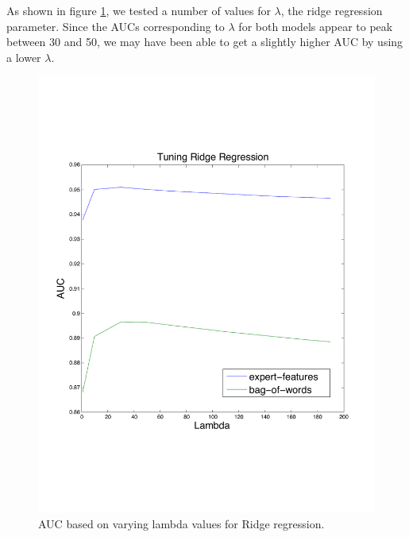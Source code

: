 \documentclass[preprint]{acm_proc_article-sp}
\begin{document}
As shown in figure \ref{fig:lambda}, we tested a number of values for $\lambda$, the ridge regression parameter. 
Since the AUCs corresponding to $\lambda$ for both models appear to peak between 30 and 50, we may have been able to 
get a slightly higher AUC by using a lower $\lambda$.

\begin{figure}[h]
    \centering
    \includegraphics[width=\linewidth]{figures/linear-ridge.pdf}
    \caption{AUC based on varying lambda values for Ridge regression.}
    \label{fig:lambda}
\end{figure}
\end{document}
